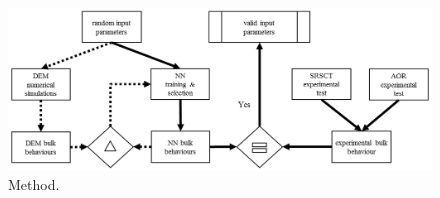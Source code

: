 \begin{figure}[!htb] 
\centering 
\includegraphics[width=.96\textwidth]{images/019methodology} 
\caption[Method]{Method.}
\label{fig:019methodology} 
\end{figure}
